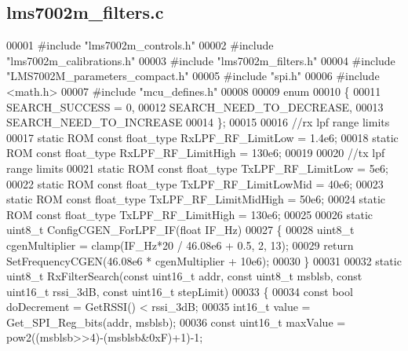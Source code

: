\subsection{lms7002m\+\_\+filters.\+c}
\label{lms7002m__filters_8c_source}

\begin{DoxyCode}
00001 \textcolor{preprocessor}{#include "lms7002m_controls.h"}
00002 \textcolor{preprocessor}{#include "lms7002m_calibrations.h"}
00003 \textcolor{preprocessor}{#include "lms7002m_filters.h"}
00004 \textcolor{preprocessor}{#include "LMS7002M_parameters_compact.h"}
00005 \textcolor{preprocessor}{#include "spi.h"}
00006 \textcolor{preprocessor}{#include <math.h>}
00007 \textcolor{preprocessor}{#include "mcu_defines.h"}
00008 
00009 \textcolor{keyword}{enum}
00010 \{
00011     SEARCH_SUCCESS = 0,
00012     SEARCH_NEED_TO_DECREASE,
00013     SEARCH_NEED_TO_INCREASE
00014 \};
00015 
00016 \textcolor{comment}{//rx lpf range limits}
00017 \textcolor{keyword}{static} ROM \textcolor{keyword}{const} float_type RxLPF_RF_LimitLow = 1.4e6;
00018 \textcolor{keyword}{static} ROM \textcolor{keyword}{const} float_type RxLPF_RF_LimitHigh = 130e6;
00019 
00020 \textcolor{comment}{//tx lpf range limits}
00021 \textcolor{keyword}{static} ROM \textcolor{keyword}{const} float_type TxLPF_RF_LimitLow = 5e6;
00022 \textcolor{keyword}{static} ROM \textcolor{keyword}{const} float_type TxLPF_RF_LimitLowMid = 40e6;
00023 \textcolor{keyword}{static} ROM \textcolor{keyword}{const} float_type TxLPF_RF_LimitMidHigh = 50e6;
00024 \textcolor{keyword}{static} ROM \textcolor{keyword}{const} float_type TxLPF_RF_LimitHigh = 130e6;
00025 
00026 \textcolor{keyword}{static} uint8\_t ConfigCGEN_ForLPF_IF(\textcolor{keywordtype}{float} IF\_Hz)
00027 \{
00028     uint8\_t cgenMultiplier = clamp(IF\_Hz*20 / 46.08e6 + 0.5, 2, 13);
00029     \textcolor{keywordflow}{return} SetFrequencyCGEN(46.08e6 * cgenMultiplier + 10e6);
00030 \}
00031 
00032 \textcolor{keyword}{static} uint8\_t RxFilterSearch(\textcolor{keyword}{const} uint16\_t addr, \textcolor{keyword}{const} uint8\_t msblsb, \textcolor{keyword}{const} uint16\_t rssi\_3dB, \textcolor{keyword}{const} 
      uint16\_t stepLimit)
00033 \{
00034     \textcolor{keyword}{const} \textcolor{keywordtype}{bool} doDecrement = GetRSSI() < rssi\_3dB;
00035     int16\_t value = Get_SPI_Reg_bits(addr, msblsb);
00036     \textcolor{keyword}{const} uint16\_t maxValue = pow2((msblsb>>4)-(msblsb&0xF)+1)-1;

\end{DoxyCode}
